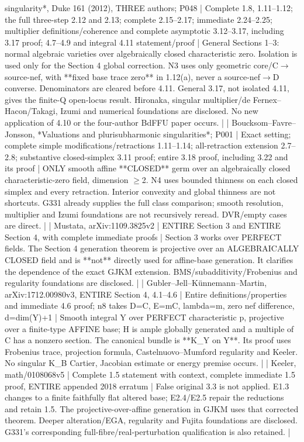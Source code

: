 \documentclass[11pt]{article}
\begin{document}
singularity*, Duke 161 (2012), THREE authors; P048 | Complete 1.8, 1.11--1.12; the full three-step 2.12 and 2.13; complete 2.15--2.17; immediate 2.24--2.25; multiplier definitions/coherence and complete asymptotic 3.12--3.17, including 3.17 proof; 4.7--4.9 and integral 4.11 statement/proof | General Sections 1--3: normal algebraic varieties over algebraically closed characteristic zero. Isolation is used only for the Section 4 global correction. N3 uses only geometric core/C\ensuremath{\to}source-nef, with **fixed base trace zero** in 1.12(a), never a source-nef\ensuremath{\to}D converse. Denominators are cleared before 4.11. General 3.17, not isolated 4.11, gives the finite-Q open-locus result. Hironaka, singular multiplier/de Fernex--Hacon/Takagi, Izumi and numerical foundations are disclosed. No new application of 4.10 or the four-author BdFFU paper occurs. | | Boucksom--Favre--Jonsson, *Valuations and plurisubharmonic singularities*; P001 | Exact setting; complete simple modifications/retractions 1.11--1.14; all-retraction extension 2.7--2.8; substantive closed-simplex 3.11 proof; entire 3.18 proof, including 3.22 and its proof | ONLY smooth affine **CLOSED** germ over an algebraically closed characteristic-zero field, dimension \ensuremath{\geq}2. N4 uses bounded thinness on each closed simplex and every retraction. Interior convexity and global thinness are not shortcuts. G331 already supplies the full class comparison; smooth resolution, multiplier and Izumi foundations are not recursively reread. DVR/empty cases are direct. | | Mustata, arXiv:1109.3825v2 | ENTIRE Section 3 and ENTIRE Section 4, with complete immediate proofs | Section 3 works over PERFECT fields. The Section 4 generation theorem is projective over an ALGEBRAICALLY CLOSED field and is **not** directly used for affine-base generation. It clarifies the dependence of the exact GJKM extension. BMS/subadditivity/Frobenius and regularity foundations are disclosed. | | Gubler--Jell--Künnemann--Martin, arXiv:1712.00980v3, ENTIRE Section 4, 4.1--4.6 | Entire definitions/properties and immediate 4.6 proof; n8 takes D=C, E=mC, lambda=m, zero nef difference, d=dim(Y)+1 | Smooth integral Y over PERFECT characteristic p, projective over a finite-type AFFINE base; H is ample globally generated and a multiple of C has a nonzero section. The canonical bundle is **K\_Y on Y**. Its proof uses Frobenius trace, projection formula, Castelnuovo--Mumford regularity and Keeler. No singular K\_B Cartier, Jacobian estimate or energy premise occurs. | | Keeler, math/0108068v5 | Complete 1.5 statement with context, complete immediate 1.5 proof, ENTIRE appended 2018 erratum | False original 3.3 is not applied. E1.3 changes to a finite faithfully flat altered base; E2.4/E2.5 repair the reductions and retain 1.5. The projective-over-affine generation in GJKM uses that corrected theorem. Deeper alteration/EGA, regularity and Fujita foundations are disclosed. G331's corresponding full-fibre/real-perturbation qualification is also retained. |
\end{document}
